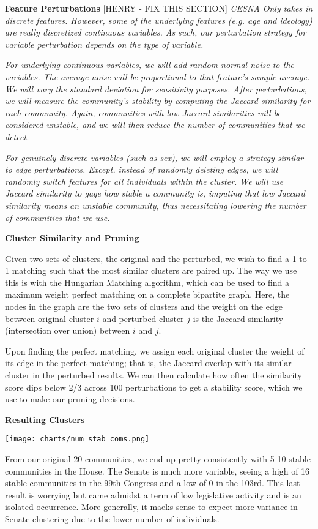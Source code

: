 \textbf{Feature Perturbations}
[HENRY - FIX THIS SECTION]
\textit{CESNA Only takes in discrete features. However, some of the underlying features 
(e.g. age and ideology) are really discretized continuous variables. As such, 
our perturbation strategy for variable perturbation depends on the type of 
variable.}

\textit{For underlying continuous variables, we will add random normal noise to the
variables. The average noise will be proportional to that feature's sample
average. We will vary the standard deviation for sensitivity purposes. After
perturbations, we will measure the community's stability by computing the
Jaccard similarity for each community. Again, communities with low Jaccard
similarities will be considered unstable, and we will then reduce the number of
communities that we detect.}

\textit{For genuinely discrete variables (such as sex), we will employ a strategy
similar to edge perturbations. Except, instead of randomly deleting edges, we
will randomly switch features for all individuals within the cluster. We will
use Jaccard similarity to gage how stable a community is, imputing that low 
Jaccard similarity means an unstable community, thus necessitating lowering 
the number of communities that we use.}

\textbf{Cluster Similarity and Pruning}

Given two sets of clusters, the original and the perturbed, we wish to find a
1-to-1 matching such that the most similar clusters are paired up. The way we
use this is with the Hungarian Matching algorithm, which can be used to find a
maximum weight perfect matching on a complete bipartite graph. Here, the nodes
in the graph are the two sets of clusters and the weight on the edge between
original cluster $i$ and perturbed cluster $j$ is the Jaccard similarity
(intersection over union) between $i$ and $j$.

Upon finding the perfect matching, we assign each original cluster the weight of
its edge in the perfect matching; that is, the Jaccard overlap with its similar
cluster in the perturbed results. We can then calculate how often the similarity
score dips below 2/3 across 100 perturbations to get a stability score, which we
use to make our pruning decisions.

\textbf{Resulting Clusters}

\texttt{[image: charts/num\_stab\_coms.png]}

From our original 20 communities, we end up pretty consistently with 5-10 stable communities in the House. The Senate is much more variable, seeing a high of 16 stable communities in the 99th Congress and a low of 0 in the 103rd. This last result is worrying but came admidst a term of low legislative activity and is an isolated occurrence. More generally, it maeks sense to expect more variance in Senate clustering due to the lower number of individuals.

